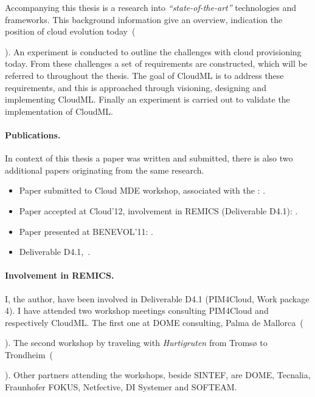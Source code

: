 Accompanying this thesis is a research into \emph{``state-of-the-art''} technologies and frameworks.
This background information give an overview, 
indication the position of cloud evolution today~(\date{April 2012}).
An experiment is conducted to outline the challenges with cloud provisioning today.
From these challenges a set of requirements are constructed, which will be
referred to throughout the thesis.
The goal of CloudML is to address these requirements,
and this is approached through visioning, designing and implementing CloudML.
Finally an experiment is carried out to validate the implementation of CloudML.

\paragraph{Publications.}

In context of this thesis a paper was written and submitted,
there is also two additional papers originating from the same research.

\begin{itemize}
  \item
    Paper submitted to Cloud MDE workshop, associated with the :
    .
  \item
    Paper accepted at Cloud'12, involvement in REMICS (Deliverable D4.1):
    .
  \item
    Paper presented at BENEVOL'11:
    .
  \item 
    Deliverable D4.1,~.
\end{itemize}

\paragraph{Involvement in REMICS.}

I, the author, have been involved in  Deliverable D4.1 (PIM4Cloud, Work package 4).
I have attended two workshop meetings consulting PIM4Cloud and respectively CloudML.
The first one at DOME consulting, Palma de Mallorca~(\date{June 2011}).
The second workshop by traveling with \emph{Hurtigruten} from Troms{\o} to Trondheim~(\date{September 2011}).
Other partners attending the workshops, beside SINTEF, are DOME, Tecnalia, Fraunhofer FOKUS, Netfective, DI Systemer and SOFTEAM.
